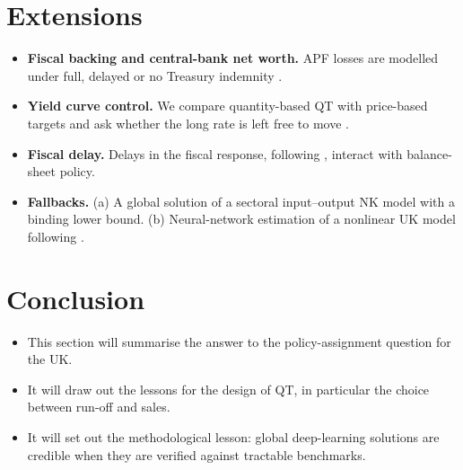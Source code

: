 \documentclass[11pt,a4paper]{article}
\begin{document}
\section{Extensions}\label{sec:ext}
\begin{itemize}
  \item \textbf{Fiscal backing and central-bank net worth.} APF losses are modelled under full, delayed or no Treasury indemnity \citep{GrodeckaMessiKliemMuller}.
  \item \textbf{Yield curve control.} We compare quantity-based QT with price-based targets and ask whether the long rate is left free to move \citep{FukuiYagasaki}.
  \item \textbf{Fiscal delay.} Delays in the fiscal response, following \citet{BayerGongKuester}, interact with balance-sheet policy.
  \item \textbf{Fallbacks.} (a) A global solution of a sectoral input--output NK model with a binding lower bound. (b) Neural-network estimation of a nonlinear UK model following \citet{Kase2024}.
\end{itemize}

\section{Conclusion}
\begin{itemize}
  \item This section will summarise the answer to the policy-assignment question for the UK.
  \item It will draw out the lessons for the design of QT, in particular the choice between run-off and sales.
  \item It will set out the methodological lesson: global deep-learning solutions are credible when they are verified against tractable benchmarks.
\end{itemize}



\end{document}
